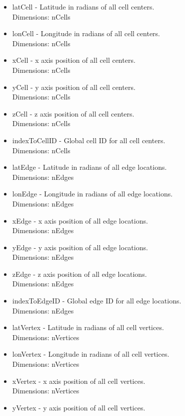 \documentclass[11pt]{report}
\begin{document}
\begin{itemize}
	\item latCell - Latitude in radians of all cell centers. \\
		  Dimensions: nCells
	\item lonCell - Longitude in radians of all cell centers. \\
		  Dimensions: nCells
	\item xCell - x axis position of all cell centers. \\
		  Dimensions: nCells
	\item yCell - y axis position of all cell centers. \\
		  Dimensions: nCells
	\item zCell - z axis position of all cell centers. \\
		  Dimensions: nCells
	\item indexToCellID - Global cell ID for all cell centers. \\
		  Dimensions: nCells
	\item latEdge - Latitude in radians of all edge locations. \\
		  Dimensions: nEdges
	\item lonEdge - Longitude in radians of all edge locations. \\
		  Dimensions: nEdges
	\item xEdge - x axis position of all edge locations. \\
		  Dimensions: nEdges
	\item yEdge - y axis position of all edge locations. \\
		  Dimensions: nEdges
	\item zEdge - z axis position of all edge locations. \\
		  Dimensions: nEdges
	\item indexToEdgeID - Global edge ID for all edge locations. \\
		  Dimensions: nEdges
	\item latVertex - Latitude in radians of all cell vertices. \\
		  Dimensions: nVertices
	\item lonVertex - Longitude in radians of all cell vertices. \\
		  Dimensions: nVertices
	\item xVertex - x axis position of all cell vertices. \\
		  Dimensions: nVertices
	\item yVertex - y axis position of all cell vertices. \\

\end{itemize}
\end{document}
